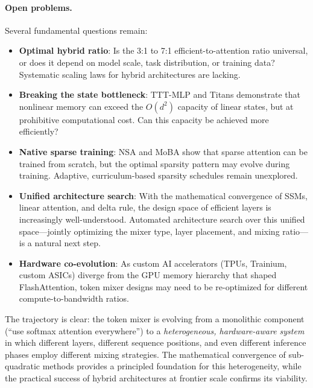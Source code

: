 \documentclass[11pt,a4paper]{article}
\begin{document}
\paragraph{Open problems.}
Several fundamental questions remain:
\begin{itemize}[nosep]
\item \textbf{Optimal hybrid ratio}: Is the 3:1 to 7:1 efficient-to-attention ratio universal, or does it depend on model scale, task distribution, or training data? Systematic scaling laws for hybrid architectures are lacking.
\item \textbf{Breaking the state bottleneck}: TTT-MLP and Titans demonstrate that nonlinear memory can exceed the $O(d^2)$ capacity of linear states, but at prohibitive computational cost. Can this capacity be achieved more efficiently?
\item \textbf{Native sparse training}: NSA and MoBA show that sparse attention can be trained from scratch, but the optimal sparsity pattern may evolve during training. Adaptive, curriculum-based sparsity schedules remain unexplored.
\item \textbf{Unified architecture search}: With the mathematical convergence of SSMs, linear attention, and delta rule, the design space of efficient layers is increasingly well-understood. Automated architecture search over this unified space---jointly optimizing the mixer type, layer placement, and mixing ratio---is a natural next step.
\item \textbf{Hardware co-evolution}: As custom AI accelerators (TPUs, Trainium, custom ASICs) diverge from the GPU memory hierarchy that shaped FlashAttention, token mixer designs may need to be re-optimized for different compute-to-bandwidth ratios.
\end{itemize}

The trajectory is clear: the token mixer is evolving from a monolithic component (``use softmax attention everywhere'') to a \emph{heterogeneous, hardware-aware system} in which different layers, different sequence positions, and even different inference phases employ different mixing strategies. The mathematical convergence of sub-quadratic methods provides a principled foundation for this heterogeneity, while the practical success of hybrid architectures at frontier scale confirms its viability.
\end{document}
